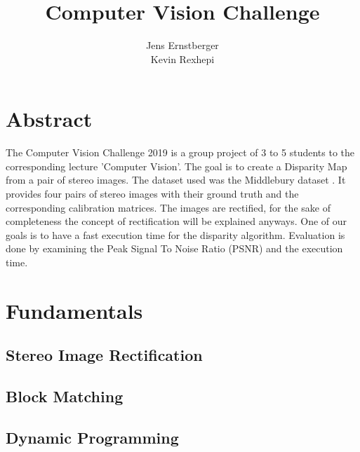 \documentclass[doctype=Studienarbeit,BCOR=15mm]{ldvbook}
\begin{document}
\title{Computer Vision Challenge}
\author{Jens Ernstberger\\ Kevin Rexhepi}
\supervisor{}


\maketitle[frontcover=Design1]


\chapter*{Abstract}

The Computer Vision Challenge 2019 is a group project of 3 to 5 students to the corresponding lecture 'Computer Vision'. The goal is to create a Disparity Map from a pair of stereo images. The dataset used was the Middlebury dataset \cite{scharstein2014high}. It provides four pairs of stereo images with their ground truth and the corresponding calibration matrices. The images are rectified, for the sake of completeness the concept of rectification will be explained anyways. One of our goals is to have a fast execution time for the disparity algorithm. Evaluation is done by examining the Peak Signal To Noise Ratio (PSNR) and the execution time.

\tableofcontents






\chapter{Fundamentals}

\section{Stereo Image Rectification}
\section{Block Matching}
\section{Dynamic Programming}
\end{document}
